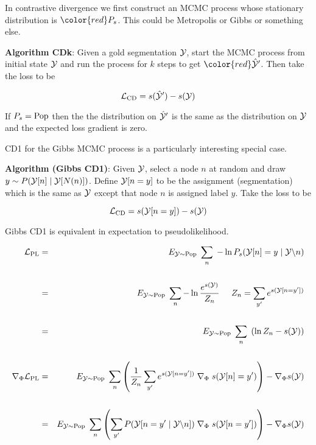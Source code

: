 {

In contrastive divergence we first construct an MCMC process whose stationary distribution is ${\color{red} P_s}$.  This could be
Metropolis or Gibbs or something else.

\vfill
{\bf Algorithm CDk}: Given a gold segmentation ${\cal Y}$, start the MCMC process from initial state ${\cal Y}$ and run the process for $k$ steps
to get ${\color{red} \hat{\cal Y}'}$.  Then take the loss to be

\vfill
{\color{red} $${\cal L}_{\mathrm{CD}}  = s(\hat{\cal Y}') - s({\cal Y})$$}

If $P_s = \mathrm{Pop}$ then the the distribution on $\hat{\cal Y}'$ is the same as the distribution on ${\cal Y}$ and the
expected loss gradient is zero.


CD1 for the Gibbs MCMC process is a particularly interesting special case.

\vfill
{\bf Algorithm (Gibbs CD1)}: Given ${\cal Y}$, select a node $n$ at random and draw {\color{red} $y \sim P({\cal Y}[n]\;| \;{\cal Y}[N(n)])$}. Define {\color{red} ${\cal Y}[n=y]$}
to be the assignment (segmentation) which is the same as ${\cal Y}$ except that node $n$ is assigned label $y$.  Take the loss to be

\vfill
{\color{red} $${\cal L}_{\mathrm{CD}}  = s({\cal Y}[n=y]) - s({\cal Y})$$}


Gibbs CD1 is equivalent in expectation to pseudolikelihood.

{\huge
\begin{eqnarray*}
{\cal L}_{\mathrm{PL}} & = & E_{{\cal Y} \sim \mathrm{Pop}}\;\sum_n \; - \ln P_s({\cal Y}[n]=y\;|\;{\cal Y}\backslash n) \\
\\
 & = & E_{{\cal Y} \sim \mathrm{Pop}}\;\sum_n -\ln \frac{e^{s({\cal Y})}}{Z_n}\;\;\;\;\;{Z_n = \sum_{y'} e^{s({\cal Y}[n=y'])}} \\
\\
& = & E_{{\cal Y} \sim \mathrm{Pop}}\;\sum_n\; \left(\ln Z_n - s({\cal Y})\right) \\
\\
\nabla_\Phi {\cal L}_{\mathrm{PL}} & = & E_{{\cal Y} \sim \mathrm{Pop}}\;\sum_n \left(\frac{1}{Z_n} \sum_{y'} e^{s({\cal Y}[n=y'])} \; \nabla_\Phi\;s({\cal Y}[n]=y')\right) - \nabla_\Phi s({\cal Y}) \\
\\
& = & E_{{\cal Y} \sim \mathrm{Pop}}\;\sum_n \left(\sum_{y'} P({\cal Y}[n=y'\;|\;{\cal Y}\backslash n]) \; \nabla_\Phi\;s({\cal Y}[n=y'])\right) - \nabla_\Phi s({\cal Y})
\end{eqnarray*}
}

}
